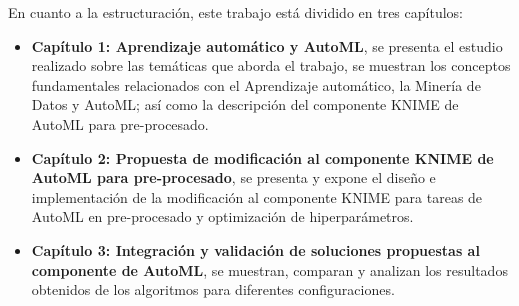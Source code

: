 En cuanto a la estructuración, este trabajo está dividido en tres capítulos:
\begin{itemize}
	\item \textbf{Capítulo 1: Aprendizaje automático y AutoML}, se presenta el estudio realizado sobre las temáticas que aborda el trabajo, se muestran los conceptos fundamentales relacionados con el Aprendizaje automático, la Minería de Datos y AutoML; así como la descripción del componente KNIME de AutoML para pre-procesado.
	\item \textbf{Capítulo 2: Propuesta de modificación al componente KNIME de AutoML para pre-procesado}, se presenta y expone el diseño e implementación de la modificación al componente KNIME para tareas de AutoML en pre-procesado y optimización de hiperparámetros.
		\item \textbf{Capítulo 3: Integración y validación de soluciones propuestas al componente de AutoML}, se muestran, comparan y analizan los resultados obtenidos de los algoritmos para diferentes configuraciones.
\end{itemize}







